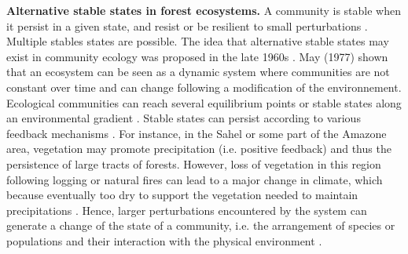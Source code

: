 \textbf{Alternative stable states in forest ecosystems.} A community is stable
when it persist in a given state, and resist or be resilient to small
perturbations \cite{Filbee-Dexter2013}. Multiple stables states are possible.
The idea that alternative stable states may exist in community ecology was
proposed in the late 1960s \cite{Scheffer2001,Society2014a}.  May (1977)
\cite{May1977} shown that an ecosystem can be seen as a dynamic system where
communities are not constant over time and can change following a modification
of the environnement. Ecological communities can reach several equilibrium
points or stable states along an environmental gradient \cite{May1977}.
Stable states can persist according to various feedback mechanisms
\cite{Filbee-Dexter2013}. For instance, in the Sahel or some part of the
Amazone area, vegetation may promote precipitation (i.e. positive feedback)
and thus the persistence of large tracts of forests. However, loss of
vegetation  in this region following logging or natural fires can lead to a
major change in climate, which because eventually too dry to support the
vegetation needed to maintain precipitations \cite{scheffer2009critical}.
Hence, larger perturbations encountered by the system can generate a change of
the state of a community, i.e. the arrangement of species or populations and
their interaction with the physical environment \cite {Filbee-Dexter2013}.\\

